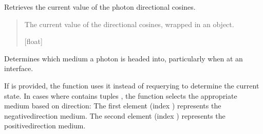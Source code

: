 \documentclass[letterpaper,10pt,english]{sphinxmanual}
\begin{document}
\begin{fulllineitems}
\begin{fulllineitems}
\label{\detokenize{generated/photon_canon.optics:photon_canon.optics.Photon.directional_cosines}}
\pysigstartsignatures
\pysigline
{}
\pysigstopsignatures
\sphinxAtStartPar
Retrieves the current value of the photon directional cosines.
\begin{quote}\begin{description}
\sphinxAtStartPar
The current value of the directional cosines, wrapped in an  object.

\sphinxAtStartPar
{\hyperref[\detokenize{generated/photon_canon.optics:photon_canon.optics.IndexableProperty}]{}}{[}float{]}

\end{description}\end{quote}

\end{fulllineitems}


\begin{fulllineitems}
\label{\detokenize{generated/photon_canon.optics:photon_canon.optics.Photon.headed_into}}
\pysigstartsignatures
\pysiglinewithargsret
{}
{}
{}
\pysigstopsignatures
\sphinxAtStartPar
Determines which medium a photon is headed into, particularly when at an interface.

\sphinxAtStartPar
If  is provided, the function uses it instead of re\sphinxhyphen{}querying  to determine the
current state. In cases where  contains tuples , the function selects the appropriate
medium based on direction:
\sphinxhyphen{} The first element (index ) represents the negative\sphinxhyphen{}direction medium.
\sphinxhyphen{} The second element (index ) represents the positive\sphinxhyphen{}direction medium.


\end{fulllineitems}
\end{fulllineitems}
\end{document}
